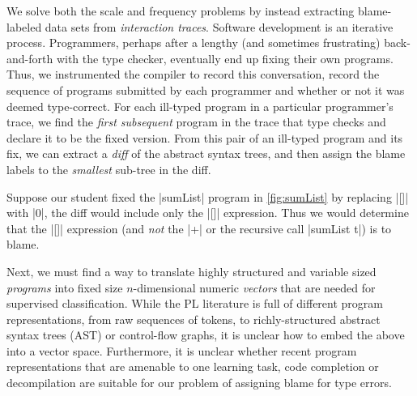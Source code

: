 %
We solve both the scale and
frequency problems by instead
extracting blame-labeled data sets
from \emph{interaction traces}.
%
Software development is an iterative process.
Programmers, perhaps after a lengthy (and
sometimes frustrating) back-and-forth with
the type checker, eventually end up fixing
their own programs.
%
Thus, we instrumented
the \ocaml compiler to record
this conversation, \ie record the sequence
of programs submitted by each programmer and
whether or not it was deemed type-correct.
%
For each ill-typed program in
a particular programmer's trace,
we find the \emph{first subsequent}
program in the trace that type checks
and declare it to be the fixed version.
%
From this pair of an ill-typed program
and its fix, we can extract a \emph{diff}
of the abstract syntax trees, and then assign
the blame labels to the \emph{smallest}
sub-tree in the diff.


Suppose our student
fixed the |sumList| program in
\autoref{fig:sumList} by replacing
|[]| with |0|, the diff would
include only the |[]| expression.
%
Thus we would determine that the
|[]| expression (and \emph{not} the
|+| or the recursive call |sumList t|)
is to blame.



Next, we must find a way to translate
highly structured and variable sized
\emph{programs} into fixed size
$n$-dimensional numeric \emph{vectors}
that are needed for supervised
classification.
%
While the PL literature is full
of different program
representations, from raw
sequences of tokens, to
richly-structured
abstract syntax trees (AST) or
control-flow graphs, it is
unclear how to embed the
above into a vector space.
%
Furthermore, it is unclear whether
recent program representations that
are amenable to one learning task,
\eg code completion \citep{Hindle2012-hf,Raychev2014-jv}
or decompilation \citep{Raychev2015-jg,Bielik2016-br}
are suitable for our problem of
assigning blame for type errors.

